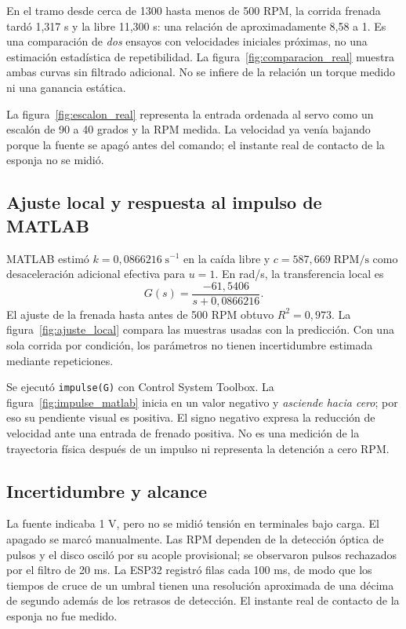 \documentclass[9pt,a4paper,twocolumn]{extarticle}
\begin{document}
En el tramo desde cerca de 1300 hasta menos de 500 RPM, la
corrida frenada tardó 1,317 s y la libre 11,300 s: una relación
de aproximadamente 8,58 a 1. Es una comparación de \emph{dos}
ensayos con velocidades iniciales próximas, no una estimación
estadística de repetibilidad. La figura~\ref{fig:comparacion_real}
muestra ambas curvas sin filtrado adicional. No se infiere de la
relación un torque medido ni una ganancia estática.



La figura~\ref{fig:escalon_real} representa la entrada ordenada al
servo como un escalón de 90 a 40 grados y la RPM medida. La velocidad
ya venía bajando porque la fuente se apagó antes del comando; el
instante real de contacto de la esponja no se midió.



\subsection{Ajuste local y respuesta al impulso de MATLAB}

MATLAB estimó $k=0{,}0866216\;\mathrm{s}^{-1}$ en la caída libre
y $c=587{,}669\;\mathrm{RPM/s}$ como desaceleración adicional
efectiva para $u=1$. En rad/s, la transferencia local es
\begin{equation}
G(s)=\frac{-61{,}5406}{s+0{,}0866216}.
\end{equation}
El ajuste de la frenada hasta antes de 500 RPM obtuvo
$R^2=0{,}973$. La figura~\ref{fig:ajuste_local} compara las muestras
usadas con la predicción. Con una sola corrida por condición,
los parámetros no tienen incertidumbre estimada mediante repeticiones.



Se ejecutó \texttt{impulse(G)} con Control System Toolbox. La
figura~\ref{fig:impulse_matlab} inicia en un valor negativo y
\emph{asciende hacia cero}; por eso su pendiente visual es positiva.
El signo negativo expresa la reducción de velocidad ante una
entrada de frenado positiva. No es una medición de la trayectoria
física después de un impulso ni representa la detención a cero RPM.



\subsection{Incertidumbre y alcance}

La fuente indicaba 1 V, pero no se midió tensión en terminales bajo
carga. El apagado se marcó manualmente. Las RPM dependen de la
detección óptica de pulsos y el disco osciló por su acople
provisional; se observaron pulsos rechazados por el filtro de
20 ms. La ESP32 registró filas cada 100 ms, de modo que los
tiempos de cruce de un umbral tienen una resolución aproximada
de una décima de segundo además de los retrasos de detección.
El instante real de contacto de la esponja no fue medido.
\end{document}
